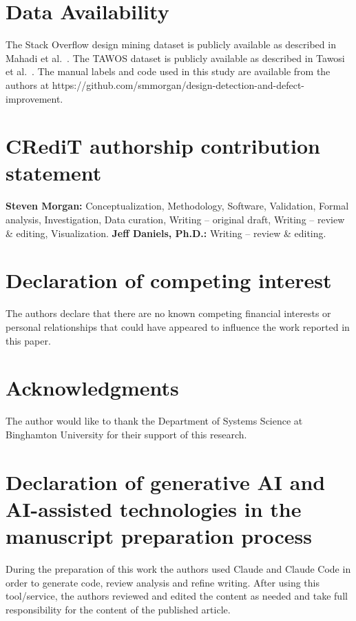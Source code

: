 \documentclass[preprint,12pt]{elsarticle}
\begin{document}
\section*{Data Availability}

The Stack Overflow design mining dataset is publicly available as described in Mahadi et al.~\cite{mahadi2021}. The TAWOS dataset is publicly available as described in Tawosi et al.~\cite{tawosi2022}. The manual labels and code used in this study are available from the authors at https://github.com/smmorgan/design-detection-and-defect-improvement.

\section*{CRediT authorship contribution statement}

\textbf{Steven Morgan:} Conceptualization, Methodology, Software, Validation, Formal analysis, Investigation, Data curation, Writing -- original draft, Writing -- review \& editing, Visualization. \textbf{Jeff Daniels, Ph.D.:} Writing -- review \& editing.

\section*{Declaration of competing interest}

The authors declare that there are no known competing financial interests or personal relationships that could have appeared to influence the work reported in this paper.

\section*{Acknowledgments}

The author would like to thank the Department of Systems Science at Binghamton University for their support of this research.

\section*{Declaration of generative AI and AI-assisted technologies in the manuscript preparation process}

During the preparation of this work the authors used Claude and Claude Code in order to generate code, review analysis and refine writing. After using this tool/service, the authors reviewed and edited the content as needed and take full responsibility for the content of the published article.



\end{document}
